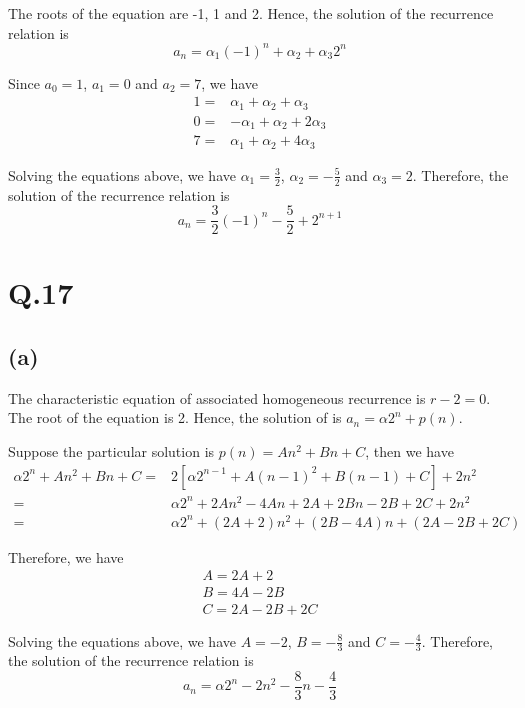\documentclass[a4paper,12pt]{article}
\begin{document}
The roots of the equation are -1, 1 and 2.
Hence, the solution of the recurrence relation is
\begin{equation*}
	a_n = \alpha_1 (-1)^n + \alpha_2 + \alpha_3 2^n
\end{equation*}

Since $a_0 = 1$, $a_1 = 0$ and $a_2 = 7$, we have
\begin{align*}
	1 =& \alpha_1 + \alpha_2 + \alpha_3 \\
	0 =& -\alpha_1 + \alpha_2 + 2\alpha_3 \\
	7 =& \alpha_1 + \alpha_2 + 4\alpha_3
\end{align*}

Solving the equations above, we have $\alpha_1 = \frac{3}{2}$, $\alpha_2 = -\frac{5}{2}$ and $\alpha_3 = 2$.
Therefore, the solution of the recurrence relation is
\begin{equation*}
	a_n = \frac{3}{2} (-1)^n - \frac{5}{2} + 2^{n + 1}
\end{equation*}

\section*{Q.17}

\subsection*{(a)}

The characteristic equation of associated homogeneous recurrence is $r - 2 = 0$.
The root of the equation is 2.
Hence, the solution of is $a_n = \alpha 2^n + p(n)$.

Suppose the particular solution is $p(n) = An^2 + Bn + C$, then we have
\begin{align*}
	\alpha 2^n + An^2 + Bn + C =& 2[\alpha 2^{n - 1} + A(n - 1)^2 + B(n - 1) + C] + 2n^2 \\
	=& \alpha 2^n + 2An^2 - 4An + 2A + 2Bn - 2B + 2C + 2n^2 \\
	=& \alpha 2^n + (2A + 2)n^2 + (2B - 4A)n + (2A - 2B + 2C)
\end{align*}

Therefore, we have
\begin{align*}
	A = 2A + 2 \\
	B = 4A - 2B \\
	C = 2A - 2B + 2C
\end{align*}

Solving the equations above, we have $A = -2$, $B = -\frac{8}{3}$ and $C = -\frac{4}{3}$.
Therefore, the solution of the recurrence relation is
\begin{equation*}
	a_n = \alpha 2^n - 2n^2 - \frac{8}{3}n - \frac{4}{3}
\end{equation*}
\end{document}

